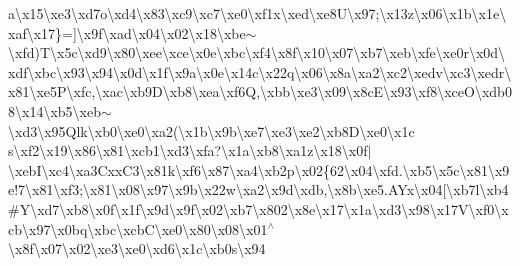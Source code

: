 a\textbackslash{}x15\textbackslash{}xe3\textbackslash{}xd7o\textbackslash{}xd4\textbackslash{}x83\textbackslash{}xc9\textbackslash{}xc7\textbackslash{}xe0\textbackslash{}xf1x\textbackslash{}xed\textbackslash{}xe8\+U\textbackslash{}x97;\textbackslash{}x13z\textbackslash{}x06\textbackslash{}x1b\textbackslash{}x1e\textbackslash{}xaf\textbackslash{}x17\}=\mbox{]}\textbackslash{}x9f\textbackslash{}xad\textbackslash{}x04\textbackslash{}x02\textbackslash{}x18\textbackslash{}xbe$\sim$\textbackslash{}xfd)\+T\textbackslash{}x5c\textbackslash{}xd9\textbackslash{}x80\textbackslash{}xee\textbackslash{}xce\textbackslash{}x0e\textbackslash{}xbc\textbackslash{}xf4\textbackslash{}x8f\textbackslash{}x10\textbackslash{}x07\textbackslash{}xb7\textbackslash{}xeb\textbackslash{}xfe\textbackslash{}xe0r\textbackslash{}x0d\textbackslash{}xdf\textbackslash{}xbc\textbackslash{}x93\textbackslash{}x94\textbackslash{}x0d\textbackslash{}x1f\textbackslash{}x9a\textbackslash{}x0e\textbackslash{}x14c\textbackslash{}x22q\textbackslash{}x06\textbackslash{}x8a\textbackslash{}xa2\textbackslash{}xc2\textbackslash{}xedv\textbackslash{}xc3\textbackslash{}xedr\textbackslash{}x81\textbackslash{}xe5\+P\textbackslash{}xfc,\textbackslash{}xac\textbackslash{}xb9\+D\textbackslash{}xb8\textbackslash{}xea\textbackslash{}xf6\+Q,\textbackslash{}xbb\textbackslash{}xe3\textbackslash{}x09\textbackslash{}x8c\+E\textbackslash{}x93\textbackslash{}xf8\textbackslash{}xce\+O\textbackslash{}xdb08\textbackslash{}x14\textbackslash{}xb5\textbackslash{}xeb$\sim$\textbackslash{}xd3\textbackslash{}x95\+Qlk\textbackslash{}xb0\textbackslash{}xe0\textbackslash{}xa2(\textbackslash{}x1b\textbackslash{}x9b\textbackslash{}xe7\textbackslash{}xe3\textbackslash{}xe2\textbackslash{}xb8\+D\textbackslash{}xe0\textbackslash{}x1c s\textbackslash{}xf2\textbackslash{}x19\textbackslash{}x86\textbackslash{}x81\textbackslash{}xcb1\textbackslash{}xd3\textbackslash{}xfa?\textbackslash{}x1a\textbackslash{}xb8\textbackslash{}xa1z\textbackslash{}x18\textbackslash{}x0f$\vert$\textbackslash{}xeb\+I\textbackslash{}xc4\textbackslash{}xa3\+Cxx\+C3\textbackslash{}x81k\textbackslash{}xf6\textbackslash{}x87\textbackslash{}xa4\textbackslash{}xb2p\textbackslash{}x02\{62\textbackslash{}x04\textbackslash{}xfd.\textbackslash{}xb5\textbackslash{}x5c\textbackslash{}x81\textbackslash{}x9e!7\textbackslash{}x81\textbackslash{}xf3;\textbackslash{}x81\textbackslash{}x08\textbackslash{}x97\textbackslash{}x9b\textbackslash{}x22w\textbackslash{}xa2\textbackslash{}x9d\textbackslash{}xdb,\textbackslash{}x8b\textbackslash{}xe5.\+A\+Yx\textbackslash{}x04\mbox{[}\textbackslash{}xb7l\textbackslash{}xb4\#\+Y\textbackslash{}xd7\textbackslash{}xb8\textbackslash{}x0f\textbackslash{}x1f\textbackslash{}x9d\textbackslash{}x9f\textbackslash{}x02\textbackslash{}xb7\textbackslash{}x802\textbackslash{}x8e\textbackslash{}x17\textbackslash{}x1a\textbackslash{}xd3\textbackslash{}x98\textbackslash{}x17\+V\textbackslash{}xf0\textbackslash{}xcb\textbackslash{}x97\textbackslash{}x0bq\textbackslash{}xbc\textbackslash{}xcb\+C\textbackslash{}xe0\textbackslash{}x80\textbackslash{}x08\textbackslash{}x01$^\wedge$\textbackslash{}x8f\textbackslash{}x07\textbackslash{}x02\textbackslash{}xe3\textbackslash{}xe0\textbackslash{}xd6\textbackslash{}x1c\textbackslash{}xb0s\textbackslash{}x94 
